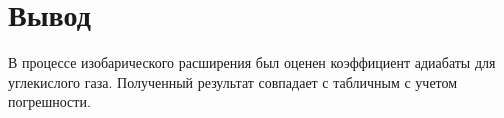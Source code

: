 \section{Вывод}
В процессе изобарического расширения был оценен коэффициент адиабаты для углекислого газа.
Полученный результат совпадает с табличным с учетом погрешности.